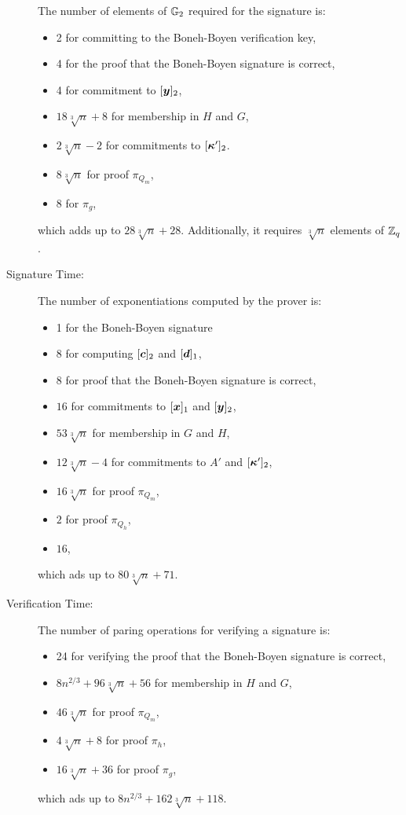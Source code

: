 \begin{description}
The number of elements of $\mathbb{G}_2$ required  for the signature is:
\begin{itemize}
\item 2 for committing to the Boneh-Boyen verification key,
\item 4 for the proof that the Boneh-Boyen signature is correct,
\item 4 for commitment to $[{\boldsymbol{y}}]_2$,
\item $18\sqrt[3]{n} + 8$ for membership in $H$ and $G$,
\item $2\sqrt[3]{n}-2$ for commitments to $[{\boldsymbol{\kappa}}']_2$.
\item $8\sqrt[3]{n}$ for proof  $\pi_{Q_m}$,
\item $8$ for $\pi_g$,
\end{itemize}
which adds up to $28\sqrt[3]{n} + 28$. Additionally, it requires $\sqrt[3]{n}$ elements of $\mathbb{Z}_q$.
\item[Signature Time:] The number of exponentiations computed by the prover is:
\begin{itemize}
\item 1 for the Boneh-Boyen signature
\item 8 for computing $[{\boldsymbol{c}}]_2$ and $[{\boldsymbol{d}}]_1$,
\item 8 for proof that the Boneh-Boyen signature is correct,
\item $16$ for commitments to $[{\boldsymbol{x}}]_1$ and $[{\boldsymbol{y}}]_2$,
\item $53\sqrt[3]{n}$ for membership in $G$ and $H$,
\item $12\sqrt[3]{n}-4$ for commitments to $A'$ and $[{\boldsymbol{\kappa}}']_2$,
\item $16\sqrt[3]{n}$ for proof $\pi_{Q_m}$,
\item $2$ for proof $\pi_{Q_h}$,
\item $16$,
\end{itemize}
which ads up to $80\sqrt[3]{n}+71$.
\item[Verification Time:] The number of paring operations for verifying a signature is:
\begin{itemize}
\item 24 for verifying the proof that the Boneh-Boyen signature is correct,
\item $8n^{2/3} + 96\sqrt[3]{n} + 56$ for membership in $H$ and $G$,
\item $46\sqrt[3]{n}$ for proof $\pi_{Q_m}$,
\item $4\sqrt[3]{n}+8$ for proof $\pi_h$,
\item $16\sqrt[3]{n}+36$ for proof $\pi_g$,
\end{itemize}
which ads up to $8n^{2/3} + 162\sqrt[3]{n} + 118$.
\end{description}
